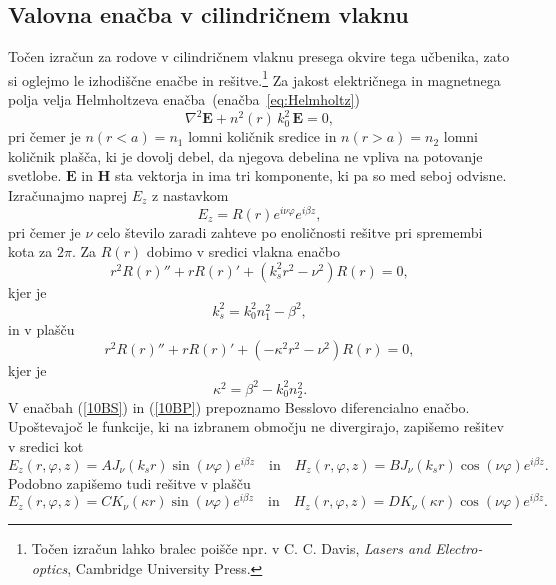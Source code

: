 \subsection*{Valovna enačba v cilindričnem vlaknu}
Točen izračun za rodove v cilindričnem vlaknu presega okvire tega učbenika, zato
si oglejmo le izhodiščne enačbe in rešitve.\footnote{Točen izračun lahko bralec poišče npr. v C. C. Davis, 
{\it Lasers and Electro-optics}, Cambridge University Press.} Za jakost električnega in magnetnega polja velja 
Helmholtzeva enačba~(enačba~\ref{eq:Helmholtz})
\begin{equation}
\nabla^2 \mathbf{E} + n^2(r)\, k_0^2\, \mathbf{E} = 0,
\end{equation}
pri čemer je $n(r<a)=n_1$ lomni količnik sredice in $n(r>a)=n_2$ 
lomni količnik plašča, ki je dovolj debel, da njegova debelina ne 
vpliva na potovanje svetlobe. $\mathbf{E}$ in $\mathbf{H}$ sta vektorja in ima
tri komponente, ki pa so med seboj odvisne. Izračunajmo naprej $E_z$ z nastavkom
\begin{equation}
E_z = R(r)e^{i \nu \varphi}e^{i \beta z},
\end{equation}
pri čemer je $\nu$ celo število zaradi zahteve po enoličnosti rešitve pri spremembi
kota za $2\pi$. Za $R(r)$ dobimo v sredici vlakna enačbo
\begin{equation}
r^2 R(r)'' + r R(r)' + (k_s^2r^2 - \nu^2)R(r) = 0,
\label{10BS}
\end{equation}
kjer je 
\begin{equation}
k_s^2=k_0^2n_1^2- \beta^2,
\label{eq:ks}
\end{equation}
in v plašču
\begin{equation}
r^2 R(r)'' + r R(r)' + (-\kappa^2r^2 - \nu^2)R(r) = 0,
\label{10BP}
\end{equation}
kjer je 
\begin{equation}
\kappa^2=\beta^2-k_0^2n_2^2.
\end{equation}
V enačbah (\ref{10BS}) in (\ref{10BP}) prepoznamo Besslovo diferencialno enačbo. 
Upoštevajoč le funkcije, ki na izbranem območju ne divergirajo, zapišemo rešitev v sredici kot
\begin{equation}
E_z (r, \varphi, z) = A J_\nu(k_sr)\sin(\nu \varphi)e^{i \beta z} \quad  \mathrm{in} \quad 
H_z (r, \varphi, z) = B J_\nu(k_sr)\cos(\nu \varphi)e^{i \beta z}.
\end{equation}
Podobno zapišemo tudi rešitve v plašču
\begin{equation}
E_z (r, \varphi, z)= C K_\nu(\kappa r)\sin(\nu \varphi)e^{i \beta z} \quad \mathrm{in} \quad 
H_z (r, \varphi, z)= D K_\nu(\kappa r)\cos(\nu \varphi)e^{i \beta z}.
\end{equation}
